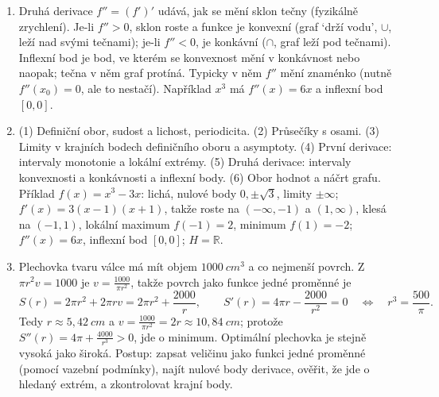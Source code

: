 \begin{enumerate}[label=\textbf{\arabic*.}, leftmargin=*, itemsep=0.8em]
  \item {}
  Druhá derivace $f'' = (f')'$ udává, jak se mění sklon tečny (fyzikálně zrychlení). Je-li $f'' > 0$, sklon roste a funkce je konvexní (graf `drží vodu', $\cup$, leží nad svými tečnami); je-li $f'' < 0$, je konkávní ($\cap$, graf leží pod tečnami). Inflexní bod je bod, ve kterém se konvexnost mění v konkávnost nebo naopak; tečna v něm graf protíná. Typicky v něm $f''$ mění znaménko (nutně $f''(x_0) = 0$, ale to nestačí). Například $x^3$ má $f''(x) = 6x$ a inflexní bod $[0, 0]$. 

  \item {}
  (1) Definiční obor, sudost a lichost, periodicita. (2) Průsečíky s osami. (3) Limity v krajních bodech definičního oboru a asymptoty. (4) První derivace: intervaly monotonie a lokální extrémy. (5) Druhá derivace: intervaly konvexnosti a konkávnosti a inflexní body. (6) Obor hodnot a náčrt grafu. Příklad $f(x) = x^3 - 3x$: lichá, nulové body $0, \pm\sqrt{3}$, limity $\pm\infty$; $f'(x) = 3(x - 1)(x + 1)$, takže roste na $(-\infty, -1)$ a $(1, \infty)$, klesá na $(-1, 1)$, lokální maximum $f(-1) = 2$, minimum $f(1) = -2$; $f''(x) = 6x$, inflexní bod $[0, 0]$; $H = \mathbb{R}$. 

  \item {}
  Plechovka tvaru válce má mít objem $1000\ \si{cm^3}$ a co nejmenší povrch. Z $\pi r^2v = 1000$ je $v = \frac{1000}{\pi r^2}$, takže povrch jako funkce jedné proměnné je
  \begin{equation*}
    S(r) = 2\pi r^2 + 2\pi rv = 2\pi r^2 + \frac{2000}{r}, \qquad S'(r) = 4\pi r - \frac{2000}{r^2} = 0 \quad\Leftrightarrow\quad r^3 = \frac{500}{\pi}.
  \end{equation*}
  Tedy $r\approx 5{,}42\ \si{cm}$ a $v = \frac{1000}{\pi r^2} = 2r\approx 10{,}84\ \si{cm}$; protože $S''(r) = 4\pi + \frac{4000}{r^3} > 0$, jde o minimum. Optimální plechovka je stejně vysoká jako široká. Postup: zapsat veličinu jako funkci jedné proměnné (pomocí vazební podmínky), najít nulové body derivace, ověřit, že jde o hledaný extrém, a zkontrolovat krajní body. 


\end{enumerate}
